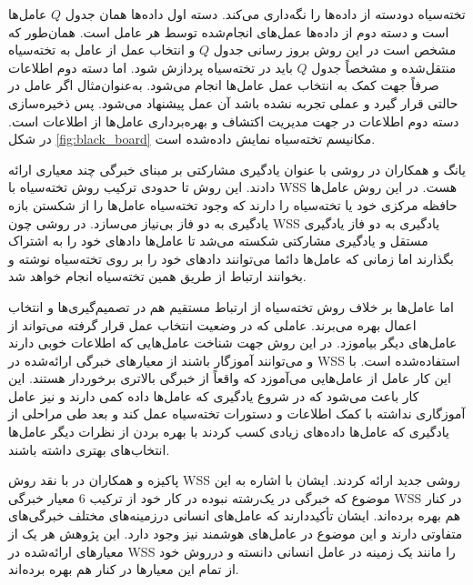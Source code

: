 تخته‌سیاه دودسته از داده‌ها را نگه‌داری می‌کند. دسته اول داده‌ها همان جدول $Q$ عامل‌ها است و دسته دوم از داده‌ها عمل‌های انجام‌شده توسط هر عامل است. همان‌طور که مشخص است در این روش بروز رسانی جدول $Q$ و انتخاب عمل از عامل به تخته‌سیاه منتقل‌شده و مشخصاً جدول $Q$ باید در تخته‌سیاه پردازش شود. اما دسته دوم اطلاعات صرفاً جهت کمک به انتخاب عمل عامل‌ها انجام می‌شود. به‌عنوان‌مثال اگر عامل در حالتی قرار گیرد و عملی تجربه نشده باشد آن عمل پیشنهاد می‌شود. پس ذخیره‌سازی دسته دوم اطلاعات در جهت مدیریت اکتشاف و بهره‌برداری عامل‌ها از اطلاعات است. در شکل \ref{fig:black_board} مکانیسم تخته‌سیاه نمایش داده‌شده است.


یانگ و همکاران در  روشی با عنوان یادگیری مشارکتی بر مبنای خبرگی چند معیاری ارائه‌ دادند. این روش تا حدودی ترکیب روش تخته‌سیاه با WSS هست. در این روش عامل‌ها حافظه مرکزی خود یا تخته‌سیاه را دارند که وجود تخته‌سیاه عامل‌ها را از شکستن بازه یادگیری به دو فاز بی‌نیاز می‌سازد. در روشی چون WSS یادگیری به دو فاز یادگیری مستقل و یادگیری مشارکتی شکسته می‌شد تا عامل‌ها دادهای خود را به اشتراک بگذارند اما زمانی که عامل‌ها دائما می‌توانند دادهای خود را بر روی تخته‌سیاه نوشته و بخوانند ارتباط از طریق همین تخته‌سیاه انجام خواهد شد.

اما عامل‌ها بر خلاف روش تخته‌سیاه از ارتباط مستقیم هم در تصمیم‌گیری‌ها و انتخاب اعمال بهره می‌برند. عاملی که در وضعیت انتخاب عمل قرار گرفته می‌تواند از عامل‌های دیگر بیاموزد. در این روش جهت شناخت عامل‌هایی که اطلاعات خوبی دارند و می‌توانند آموزگار باشند از معیارهای خبرگی ارائه‌شده در WSS استفاده‌شده است. با این کار عامل از عامل‌هایی می‌آموزد که واقعاً از خبرگی بالاتری برخوردار هستند. این کار باعث می‌شود که در شروع یادگیری که عامل‌ها داده کمی دارند و نیز عامل آموزگاری نداشته با کمک اطلاعات و دستورات تخته‌سیاه عمل کند و بعد طی مراحلی از یادگیری که عامل‌ها داده‌های زیادی کسب کردند با بهره بردن از نظرات دیگر عامل‌ها انتخاب‌های بهتری داشته باشند.

پاکیزه و همکاران در  با نقد روش WSS روشی جدید ارائه کردند. ایشان با اشاره به این موضوع که خبرگی در یک‌رشته نبوده در کار خود از ترکیب 6 معیار خبرگی WSS در کنار هم بهره برده‌اند. ایشان تأکیددارند که عامل‌های انسانی درزمینه‌های مختلف خبرگی‌های متفاوتی دارند و این موضوع در عامل‌های هوشمند نیز وجود دارد. این پژوهش هر یک از معیارهای ارائه‌شده در WSS را مانند یک زمینه در عامل انسانی دانسته و درروش خود از تمام این معیارها در کنار هم بهره برده‌اند.

